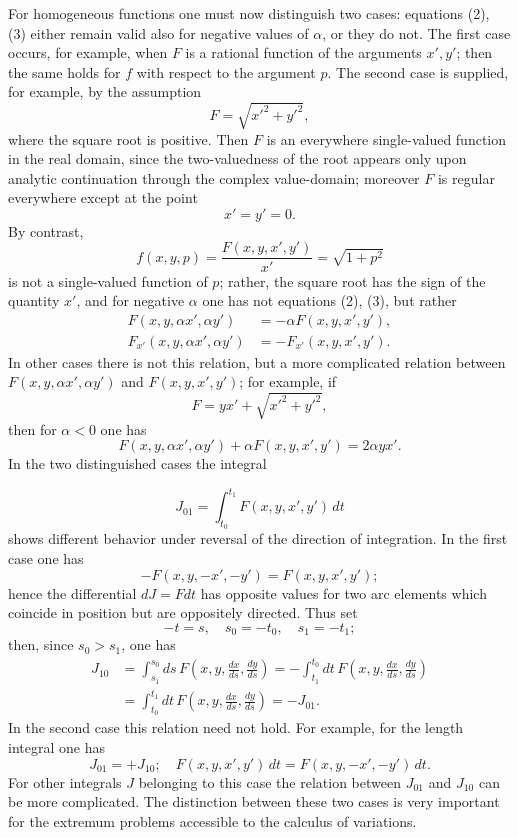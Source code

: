 \documentclass[11pt,a4paper,leqno]{article}
\begin{document}
For homogeneous functions one must now distinguish two cases: equations (2), (3) either remain valid also for negative values of $\alpha$, or they do not. The first case occurs, for example, when $F$ is a rational function of the arguments $x',y'$; then the same holds for $f$ with respect to the argument $p$. The second case is supplied, for example, by the assumption
\[
 F=\sqrt{x'^2+y'^2},
\]
where the square root is positive. Then $F$ is an everywhere single-valued function in the real domain, since the two-valuedness of the root appears only upon analytic continuation through the complex value-domain; moreover $F$ is regular everywhere except at the point
\[
 x'=y'=0.
\]
By contrast,
\[
 f(x,y,p)=\frac{F(x,y,x',y')}{x'}=\sqrt{1+p^2}
\]
is not a single-valued function of $p$; rather, the square root has the sign of the quantity $x'$, and for negative $\alpha$ one has not equations (2), (3), but rather
\[
\begin{aligned}
 F(x,y,\alpha x',\alpha y')&=-\alpha F(x,y,x',y'),\\
 F_{x'}(x,y,\alpha x',\alpha y')&=-F_{x'}(x,y,x',y').
\end{aligned}
\]
In other cases there is not this relation, but a more complicated relation between $F(x,y,\alpha x',\alpha y')$ and $F(x,y,x',y')$; for example, if
\[
 F=yx'+\sqrt{x'^2+y'^2},
\]
then for $\alpha<0$ one has
\[
 F(x,y,\alpha x',\alpha y')+\alpha F(x,y,x',y')=2\alpha yx'.
\]
In the two distinguished cases the integral

\[
 J_{01}=\int_{t_0}^{t_1}F(x,y,x',y')\,dt
\]
shows different behavior under reversal of the direction of integration. In the first case one has
\[
 -F(x,y,-x',-y')=F(x,y,x',y');
\]
hence the differential $dJ=Fdt$ has opposite values for two arc elements which coincide in position but are oppositely directed. Thus set
\[
 -t=s,\quad s_0=-t_0,\quad s_1=-t_1;
\]
then, since $s_0>s_1$, one has
\[
\begin{aligned}
 J_{10}
 &=\int_{s_1}^{s_0}ds\,F\left(x,y,\frac{dx}{ds},\frac{dy}{ds}\right)
 =-\int_{t_1}^{t_0}dt\,F\left(x,y,\frac{dx}{ds},\frac{dy}{ds}\right)\\
 &=\int_{t_0}^{t_1}dt\,F\left(x,y,\frac{dx}{ds},\frac{dy}{ds}\right)=-J_{01}.
\end{aligned}
\]
In the second case this relation need not hold. For example, for the length integral one has
\[
 J_{01}=+J_{10};\quad F(x,y,x',y')\,dt=F(x,y,-x',-y')\,dt.
\]
For other integrals $J$ belonging to this case the relation between $J_{01}$ and $J_{10}$ can be more complicated. The distinction between these two cases is very important for the extremum problems accessible to the calculus of variations.
\end{document}
